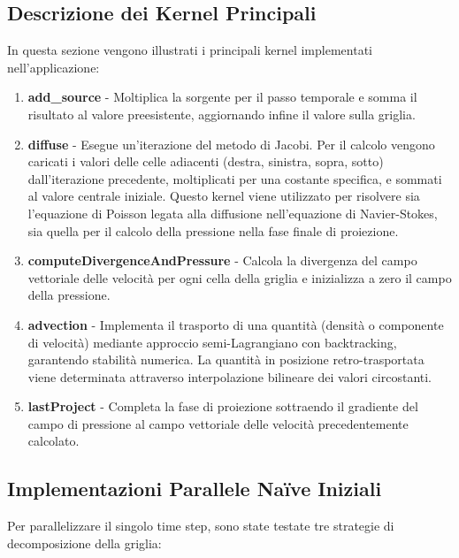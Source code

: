 \documentclass[12pt,a4paper,openany,twoside]{article}
\begin{document}
\subsection{Descrizione dei Kernel Principali}
In questa sezione vengono illustrati i principali kernel implementati nell'applicazione:
\begin{enumerate}
    \item \textbf{add\_source} - Moltiplica la sorgente per il passo temporale  e somma il risultato al valore preesistente, aggiornando infine il valore sulla griglia.

    \item \textbf{diffuse} - Esegue un'iterazione del metodo di Jacobi. Per il calcolo vengono caricati i valori delle celle adiacenti (destra, sinistra, sopra, sotto) dall'iterazione precedente, moltiplicati per una costante specifica, e sommati al valore centrale iniziale. Questo kernel viene utilizzato per risolvere sia l'equazione di Poisson legata alla diffusione nell'equazione di Navier-Stokes, sia quella per il calcolo della pressione nella fase finale di proiezione.

    \item \textbf{computeDivergenceAndPressure} - Calcola la divergenza del campo vettoriale delle velocità per ogni cella della griglia e inizializza a zero il campo della pressione.

    \item \textbf{advection} - Implementa il trasporto di una quantità (densità o componente di velocità) mediante approccio semi-Lagrangiano con backtracking, garantendo stabilità numerica. La quantità in posizione retro-trasportata viene determinata attraverso interpolazione bilineare dei valori circostanti.

    \item \textbf{lastProject} - Completa la fase di proiezione sottraendo il gradiente del campo di pressione al campo vettoriale delle velocità precedentemente calcolato.

\end{enumerate}


\subsection{Implementazioni Parallele Na{\"i}ve Iniziali}
Per parallelizzare il singolo time step, sono state testate tre strategie di decomposizione della griglia:
\end{document}
